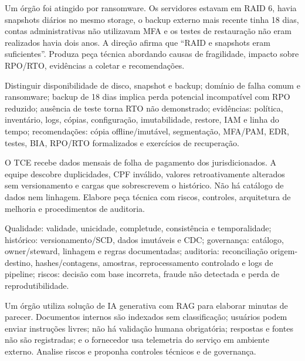 \begin{discursiva}
Um órgão foi atingido por ransomware. Os servidores estavam em RAID 6, havia snapshots diários no mesmo storage, o backup externo mais recente tinha 18 dias, contas administrativas não utilizavam MFA e os testes de restauração não eram realizados havia dois anos. A direção afirma que ``RAID e snapshots eram suficientes''. Produza peça técnica abordando causas de fragilidade, impacto sobre RPO/RTO, evidências a coletar e recomendações.
\end{discursiva}

\begin{resumo}
Distinguir disponibilidade de disco, snapshot e backup; domínio de falha comum e ransomware; backup de 18 dias implica perda potencial incompatível com RPO reduzido; ausência de teste torna RTO não demonstrado; evidências: política, inventário, logs, cópias, configuração, imutabilidade, restore, IAM e linha do tempo; recomendações: cópia offline/imutável, segmentação, MFA/PAM, EDR, testes, BIA, RPO/RTO formalizados e exercícios de recuperação.
\end{resumo}

\begin{discursiva}
O TCE recebe dados mensais de folha de pagamento dos jurisdicionados. A equipe descobre duplicidades, CPF inválido, valores retroativamente alterados sem versionamento e cargas que sobrescrevem o histórico. Não há catálogo de dados nem linhagem. Elabore peça técnica com riscos, controles, arquitetura de melhoria e procedimentos de auditoria.
\end{discursiva}

\begin{resumo}
Qualidade: validade, unicidade, completude, consistência e temporalidade; histórico: versionamento/SCD, dados imutáveis e CDC; governança: catálogo, owner/steward, linhagem e regras documentadas; auditoria: reconciliação origem-destino, hashes/contagens, amostras, reprocessamento controlado e logs de pipeline; riscos: decisão com base incorreta, fraude não detectada e perda de reprodutibilidade.
\end{resumo}

\begin{discursiva}
Um órgão utiliza solução de IA generativa com RAG para elaborar minutas de parecer. Documentos internos são indexados sem classificação; usuários podem enviar instruções livres; não há validação humana obrigatória; respostas e fontes não são registradas; e o fornecedor usa telemetria do serviço em ambiente externo. Analise riscos e proponha controles técnicos e de governança.
\end{discursiva}

